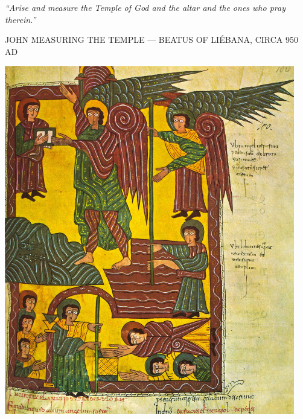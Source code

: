 \clearpage
\thispagestyle{empty}
\null\vfill
\settowidth{}
\begin{center}
\parbox{\longest}{%
  \raggedright{\huge\itshape%
    ``Arise and measure the Temple of God and the altar and the ones who pray therein.'' \par\bigskip
  }
  \raggedleft\Large\MakeUppercase{John Measuring the Temple — Beatus of Liébana, circa 950 AD}\par%
}
\vfill\vfill
\clearpage\newpage
\end{center}
\newpage
\thispagestyle{empty}
\begin{center}
	\includegraphics[width=0.95\textwidth]{images/illustrations/facundusmeasuringtemple}
\end{center}